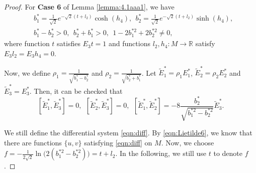 \documentclass[reqno]{amsart}%
\theoremstyle{definition}
\numberwithin{equation}{section}
\begin{document}
%
\begin{proof}
For {\bf Case 6} of Lemma \ref{lemma:4.1aaa1}, we have
$$
\begin{aligned}
&b_1^*=\frac{1}{\sqrt{2}}e^{-\sqrt{2}(t+l_2)}\cosh(h_4),\ \
b_2^*=\frac{1}{\sqrt{2}}e^{-\sqrt{2}(t+l_2)}\sinh(h_4),\\
&b_1^*-b_2^*>0,\ \ b_2^*+b_1^*>0,\ \ 1-2b_1^{*2}+2b_2^{*2}\neq0,
\end{aligned}
$$
where function $t$ satisfies $E_3t=1$ and functions $l_2, h_4:M\rightarrow \mathbb{R}$
satisfy $E_3l_2=E_3h_4=0$.






Now, we define $\rho_1=\frac{1}{\sqrt{b_1^*-b_2^*}}$ and $\rho_2=\frac{1}{\sqrt{b_2^*+b_1^*}}$.
Let $\tilde{E}_1^*=\rho_1E_1^*$, $\tilde{E}_2^*=\rho_2E_2^*$ and $\tilde{E}_3^*=E_3^*$.
Then, it can be checked that
\begin{equation}\label{eqn:Lietilde6}
[\tilde{E}_1^*,\tilde{E}_3^*]=0,\ \ [\tilde{E}_2^*,\tilde{E}_3^*]=0,\ \
[\tilde{E}_1^*,\tilde{E}_2^*]=-8\frac{b_2^*}{\sqrt{b_1^{*2}-b_2^{*2}}}\tilde{E}_3^*.
\end{equation}

We still define the differential system \eqref{eqn:diff}. By  \eqref{eqn:Lietilde6},
we know that there are functions $\{u,v\}$ satisfying \eqref{eqn:diff} on $M$.
Now, we choose %
$f=-\frac{1}{2\sqrt{2}}\ln\Big(2(b_1^{*2}-b_2^{*2})\Big)=t+l_2$. In the following,
we still use $t$ to denote $f$.


\end{proof}
\end{document}
